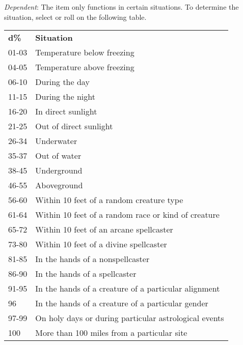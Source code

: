 \textit{Dependent}: The item only functions in certain situations. To determine the situation, select or roll on the following table.
\begin{tabular}{ll}
\textbf{d\%} & \textbf{Situation}                                    \\
01-03        & Temperature below freezing                            \\
04-05        & Temperature above freezing                            \\
06-10        & During the day                                        \\
11-15        & During the night                                      \\
16-20        & In direct sunlight                                    \\
21-25        & Out of direct sunlight                                \\
26-34        & Underwater                                            \\
35-37        & Out of water                                          \\
38-45        & Underground                                           \\
46-55        & Aboveground                                           \\
56-60        & Within 10 feet of a random creature type              \\
61-64        & Within 10 feet of a random race or kind of creature   \\
65-72        & Within 10 feet of an arcane spellcaster               \\
73-80        & Within 10 feet of a divine spellcaster                \\
81-85        & In the hands of a nonspellcaster                      \\
86-90        & In the hands of a spellcaster                         \\
91-95        & In the hands of a creature of a particular alignment  \\
96           & In the hands of a creature of a particular gender     \\
97-99        & On holy days or during particular astrological events \\
100            & More than 100 miles from a particular site           
\end{tabular}

